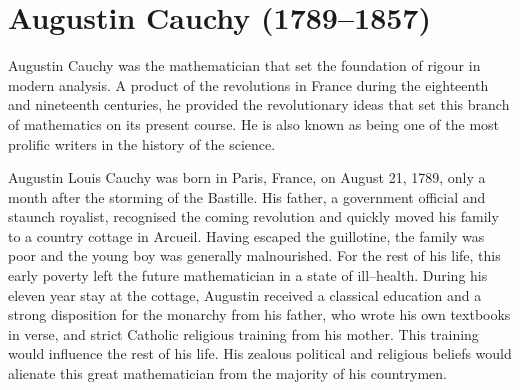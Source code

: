 \pagebreak
\section*{Augustin Cauchy (1789--1857)}

Augustin Cauchy was the mathematician that set the foundation of rigour in
modern analysis. A product of the revolutions in France during the eighteenth
and nineteenth centuries, he provided the revolutionary ideas that set this
branch of mathematics on its present course. He is also known as being one of
the most prolific writers in the history of the science.

Augustin Louis Cauchy was born in Paris, France, on August 21, 1789, only a
month after the storming of the Bastille. His father, a government official and
staunch royalist, recognised the coming revolution and quickly moved his family
to a country cottage in Arcueil. Having escaped the guillotine, the family was
poor and the young boy was generally malnourished. For the rest of his life,
this early poverty left the future mathematician in a state of ill--health.
During his eleven year stay at the cottage, Augustin received a classical
education and a strong disposition for the monarchy from his father, who wrote
his own textbooks in verse, and strict Catholic religious training from his
mother. This training would influence the rest of his life. His zealous
political and religious beliefs would alienate this great mathematician from the
majority of his countrymen.


